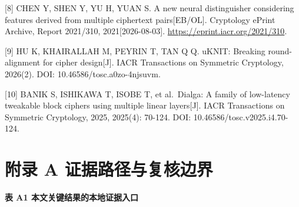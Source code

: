 \documentclass[
  a4paper,
  UTF8]{ctexart}
\begin{document}
{[}8{]} CHEN Y, SHEN Y, YU H, YUAN S. A new neural distinguisher
considering features derived from multiple ciphertext pairs{[}EB/OL{]}.
Cryptology ePrint Archive, Report 2021/310, 2021{[}2026-08-03{]}.
\url{https://eprint.iacr.org/2021/310}.

{[}9{]} HU K, KHAIRALLAH M, PEYRIN T, TAN Q Q. uKNIT: Breaking
round-alignment for cipher design{[}J{]}. IACR Transactions on Symmetric
Cryptology, 2026(2). DOI: 10.46586/tosc.a0zo-4njsuvm.

{[}10{]} BANIK S, ISHIKAWA T, ISOBE T, et al.~Dialga: A family of
low-latency tweakable block ciphers using multiple linear layers{[}J{]}.
IACR Transactions on Symmetric Cryptology, 2025, 2025(4): 70-124. DOI:
10.46586/tosc.v2025.i4.70-124.

\hypertarget{ux9644ux5f55-a-ux8bc1ux636eux8defux5f84ux4e0eux590dux6838ux8fb9ux754c}{%
\section{附录 A
证据路径与复核边界}\label{ux9644ux5f55-a-ux8bc1ux636eux8defux5f84ux4e0eux590dux6838ux8fb9ux754c}}

\textbf{表 A1 本文关键结果的本地证据入口}
\end{document}

